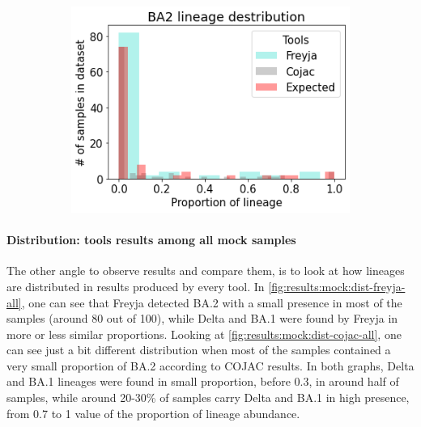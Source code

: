 \begin{figure}[H]
            \hfill
            \begin{subfigure}[b]{0.3\textwidth}
            \includegraphics[width=1\textwidth]{figures/results/mock/distr-ba2.png}
            \label{fig:results:mock:dist-ba1-all}
            \end{subfigure}
        \end{figure}
        
        \paragraph{Distribution: tools results among all mock samples}
        The other angle to observe results and compare them, is to look at how lineages are distributed in results produced by every tool. In \cref{fig:results:mock:dist-freyja-all}, one can see that Freyja detected BA.2 with a small presence in most of the samples (around 80 out of 100), while Delta and BA.1 were found by Freyja in more or less similar proportions. Looking at \cref{fig:results:mock:dist-cojac-all}, one can see just a bit different distribution when most of the samples contained a very small proportion of BA.2 according to COJAC results. In both graphs, Delta and BA.1 lineages were found in small proportion, before 0.3, in around half of samples, while around 20-30\% of samples carry Delta and BA.1 in high presence, from 0.7 to 1 value of the proportion of lineage abundance.
        
